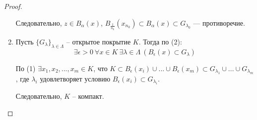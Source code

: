 \begin{theorem}
\begin{proof}
\begin{enumerate}
            Следовательно, $z \in B_\alpha(x)$, $B_{\frac{1}{n_k}}(x_{n_k}) \subset B_\alpha(x) \subset G_{\lambda_0}$ --- противоречие.
    
            \item Пусть $\{G_{\lambda}\}_{\lambda \in \Lambda}$ -- открытое покрытие $K$. Тогда по (2):
            \[\exists \epsilon > 0 \ \forall x \in K \ \exists \lambda \in \Lambda \ (B_{\epsilon}(x) \subset G_{\lambda})\]
    
            По (1) $\exists x_{1}, x_{2}, ..., x_{m} \in K$, что $K \subset B_{\epsilon}(x_{i}) \cup ... \cup B_{\epsilon}(x_{m}) \subset G_{\lambda_{1}} \cup ... \cup G_{\lambda_{m}}$, где $\lambda_{i}$ удовлетворяет условию $B_{\epsilon}(x_{i}) \subset G_{\lambda_{i}}$.
    
            Следовательно, $K$ -- компакт.
        \end{enumerate}
    \end{proof}
\end{theorem}